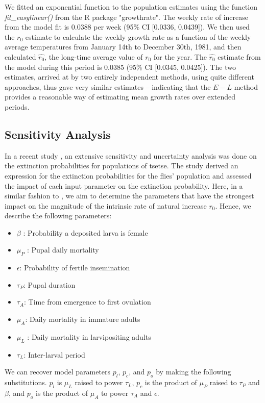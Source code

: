 \documentclass[12pt,a4paper]{article}
\begin{document}
We fitted an exponential function to the population estimates using the function \textit{fit\_easylinear()} from the R package "growthrate". The weekly rate of increase from the model fit is 0.0388 per week (95\% CI [0.0336, 0.0439]). We then used the $r_0$ estimate to calculate the weekly growth rate as a function of the weekly average temperatures from January 14th to December 30th, 1981, and then calculated $\hat{r_0}$, the long-time average value of $r_0$ for the year. The $\hat{r_0}$ estimate from the model during this period is 0.0385 (95\% CI [0.0345, 0.0425]). The two estimates, arrived at by two entirely independent methods, using quite different approaches, thus gave very similar estimates – indicating that the $E-L$ method provides a reasonable way of estimating mean  growth rates over extended periods.

\subsection*{Sensitivity Analysis}
In a recent study \cite{are2019weakest}, an extensive sensitivity and uncertainty analysis was done on the extinction probabilities for populations of tsetse. The study derived an expression for the extinction probabilities for the flies' population and assessed the impact of each input parameter on the extinction probability. Here, in  a similar fashion to \cite{are2019weakest}, we aim to determine the parameters that have the strongest impact on the magnitude of the intrinsic rate of natural increase $r_0$. Hence, we describe the following parameters:
\begin{itemize}
	\item $\beta$ : Probability a deposited larva is female
	\item $\mu_P$ : Pupal daily mortality
	\item $\epsilon$: Probability of fertile insemination
	\item $\tau_P$: Pupal duration
	\item $\tau_A$: Time from emergence to first ovulation 
	\item $\mu_A$: Daily mortality in immature adults 
	\item $\mu_L$ : Daily mortality in larvipositing adults 
	\item $\tau_L$: Inter-larval period
\end{itemize}
We can recover model parameters $p_l$, $p_c$, and $p_o$ by making the following substitutions. $p_l$ is $\mu_L$ raised to power $\tau_L$, $p_c$ is the product of $\mu_P$ raised to $\tau_P$ and $\beta$, and $p_o$ is the product of $\mu_A$ to power $\tau_A$  and $\epsilon$.  
 
\end{document}
